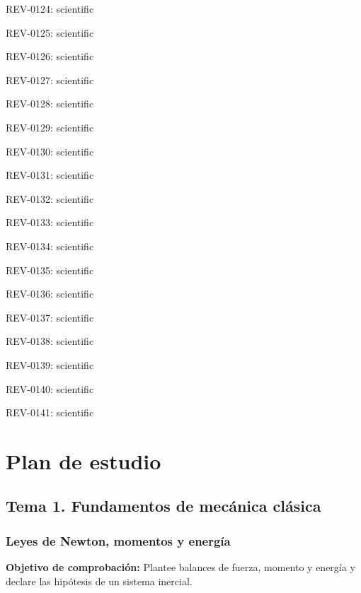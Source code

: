 \documentclass[10pt,openany]{book}
\begin{document}
\noindent REV-0124:  scientific\par

\noindent REV-0125:  scientific\par

\noindent REV-0126:  scientific\par

\noindent REV-0127:  scientific\par

\noindent REV-0128:  scientific\par

\noindent REV-0129:  scientific\par

\noindent REV-0130:  scientific\par

\noindent REV-0131:  scientific\par

\noindent REV-0132:  scientific\par

\noindent REV-0133:  scientific\par

\noindent REV-0134:  scientific\par

\noindent REV-0135:  scientific\par

\noindent REV-0136:  scientific\par

\noindent REV-0137:  scientific\par

\noindent REV-0138:  scientific\par

\noindent REV-0139:  scientific\par

\noindent REV-0140:  scientific\par

\noindent REV-0141:  scientific\par
\chapter{Plan de estudio}



\section*{Tema 1. Fundamentos de mecánica clásica}

\subsection*{Leyes de Newton, momentos y energía}
\noindent \textbf{Objetivo de comprobación:} Plantee balances de fuerza, momento y energía y declare las hipótesis de un sistema inercial.
\end{document}
